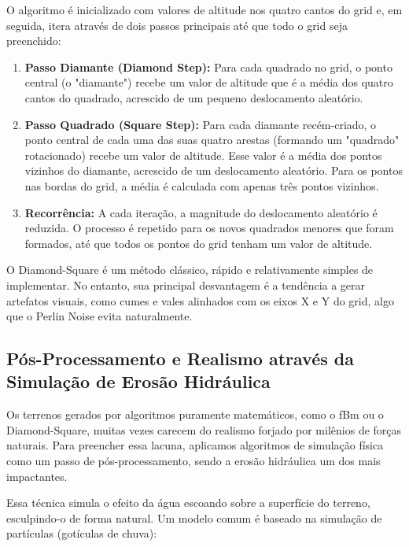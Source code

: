 O algoritmo é inicializado com valores de altitude nos quatro cantos do grid e, em seguida, itera através de dois passos principais até que todo o grid seja preenchido:

\begin{enumerate}
    \item \textbf{Passo Diamante (Diamond Step):} Para cada quadrado no grid, o ponto central (o "diamante") recebe um valor de altitude que é a média dos quatro cantos do quadrado, acrescido de um pequeno deslocamento aleatório.

    \item \textbf{Passo Quadrado (Square Step):} Para cada diamante recém-criado, o ponto central de cada uma das suas quatro arestas (formando um "quadrado" rotacionado) recebe um valor de altitude. Esse valor é a média dos pontos vizinhos do diamante, acrescido de um deslocamento aleatório. Para os pontos nas bordas do grid, a média é calculada com apenas três pontos vizinhos.

    \item \textbf{Recorrência:} A cada iteração, a magnitude do deslocamento aleatório é reduzida. O processo é repetido para os novos quadrados menores que foram formados, até que todos os pontos do grid tenham um valor de altitude.
\end{enumerate}

O Diamond-Square é um método clássico, rápido e relativamente simples de implementar. No entanto, sua principal desvantagem é a tendência a gerar artefatos visuais, como cumes e vales alinhados com os eixos X e Y do grid, algo que o Perlin Noise evita naturalmente.

\subsection{Pós-Processamento e Realismo através da Simulação de Erosão Hidráulica}

Os terrenos gerados por algoritmos puramente matemáticos, como o fBm ou o Diamond-Square, muitas vezes carecem do realismo forjado por milênios de forças naturais. Para preencher essa lacuna, aplicamos algoritmos de simulação física como um passo de pós-processamento, sendo a erosão hidráulica um dos mais impactantes.

Essa técnica simula o efeito da água escoando sobre a superfície do terreno, esculpindo-o de forma natural. Um modelo comum é baseado na simulação de partículas (gotículas de chuva):

